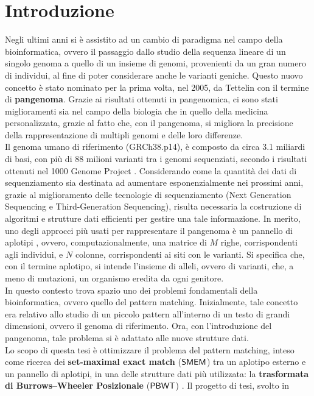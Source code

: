 \documentclass[a4paper,12pt, oneside]{book}
\def\PBWT{\mbox{\rm {\sf PBWT}}}
\def\SMEM{\mbox{\rm {\sf SMEM}}}
\begin{document}
\chapter{Introduzione}
Negli ultimi anni si è assistito ad un cambio di paradigma nel campo della
bioinformatica, ovvero il passaggio dallo studio della sequenza lineare di un
singolo genoma a quello di un insieme di genomi, provenienti da un gran numero
di individui, al fine di poter considerare anche le varianti
geniche. Questo nuovo concetto è stato nominato per la prima volta, nel 2005,
da Tettelin \cite{tettelin} con il termine di \textbf{pangenoma}. Grazie ai
risultati ottenuti in pangenomica, ci sono stati miglioramenti sia nel 
campo della biologia che in quello della medicina personalizzata, grazie al
fatto che, con il pangenoma, si migliora la precisione della rappresentazione di
multipli genomi e delle loro differenze. \\
Il genoma umano di riferimento (GRCh38.p14), è composto da circa
3.1 miliardi di basi, con più di 88 milioni 
varianti tra i genomi sequenziati, secondo i risultati ottenuti nel 1000 Genome
Project \cite{tutorial}. Considerando come la quantità dei dati di
sequenziamento sia destinata 
ad aumentare esponenzialmente nei prossimi anni, grazie al
miglioramento delle tecnologie di sequenziamento (Next Generation Sequencing e
Third-Generation Sequencing), risulta necessaria la costruzione di algoritmi e
strutture dati efficienti per gestire una tale informazione. 
In merito, uno degli approcci più usati per rappresentare il pangenoma è un
pannello di aplotipi \cite{pancon}, ovvero, computazionalmente, una matrice di
$M$ righe, corrispondenti agli individui, e $N$ colonne, corrispondenti ai siti
con le varianti. Si specifica che, con il termine
aplotipo, si intende l'insieme di alleli, ovvero di varianti, che, a meno di
mutazioni, un organismo eredita da ogni genitore.\\
In questo contesto trova spazio uno dei problemi fondamentali della
bioinformatica, ovvero quello del pattern matching. Inizialmente, tale concetto
era relativo allo studio di un piccolo pattern all'interno di un testo di
grandi dimensioni, ovvero il genoma di riferimento. Ora, con l'introduzione 
del pangenoma, tale problema si è adattato alle nuove strutture
dati.\\
Lo scopo di questa tesi è ottimizzare il problema del pattern 
matching, inteso come ricerca dei \textbf{set-maximal exact match}
  ($\SMEM$) tra un aplotipo 
esterno e un pannello di aplotipi, in una delle 
strutture dati più utilizzata: la \textbf{trasformata di Burrows--Wheeler
  Posizionale} ($\PBWT$) \cite{pbwt}. Il progetto di tesi, svolto in
\end{document}
